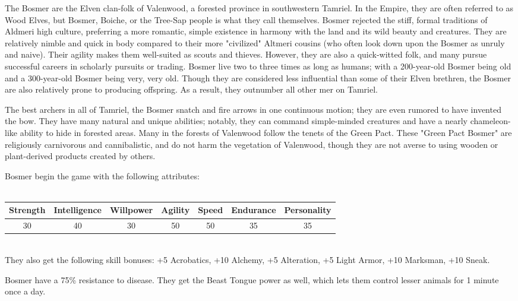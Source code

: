 \documentclass[12pt]{article}
\begin{document}
The Bosmer are the Elven clan-folk of Valenwood, a forested province in southwestern Tamriel. In the Empire, they are often referred to as Wood Elves, but Bosmer, Boiche, or the Tree-Sap people is what they call themselves. Bosmer rejected the stiff, formal traditions of Aldmeri high culture, preferring a more romantic, simple existence in harmony with the land and its wild beauty and creatures. They are relatively nimble and quick in body compared to their more "civilized" Altmeri cousins (who often look down upon the Bosmer as unruly and naive). Their agility makes them well-suited as scouts and thieves. However, they are also a quick-witted folk, and many pursue successful careers in scholarly pursuits or trading. Bosmer live two to three times as long as humans; with a 200-year-old Bosmer being old and a 300-year-old Bosmer being very, very old. Though they are considered less influential than some of their Elven brethren, the Bosmer are also relatively prone to producing offspring. As a result, they outnumber all other mer on Tamriel.

The best archers in all of Tamriel, the Bosmer snatch and fire arrows in one continuous motion; they are even rumored to have invented the bow. They have many natural and unique abilities; notably, they can command simple-minded creatures and have a nearly chameleon-like ability to hide in forested areas. Many in the forests of Valenwood follow the tenets of the Green Pact. These "Green Pact Bosmer" are religiously carnivorous and cannibalistic, and do not harm the vegetation of Valenwood, though they are not averse to using wooden or plant-derived products created by others.

Bosmer begin the game with the following attributes:\\~\\
\begin{tabular}{|c|c|c|c|c|c|c|}
\hline
Strength & Intelligence & Willpower & Agility & Speed & Endurance & Personality\\ \hline
30 & 40 & 30 & 50 & 50 & 35 & 35\\ \hline

\end{tabular}\\

They also get the following skill bonuses: +5 Acrobatics, +10 Alchemy, +5 Alteration, +5 Light Armor, +10 Marksman, +10 Sneak.

Bosmer have a 75\% resistance to disease. They get the Beast Tongue power as well, which lets them control lesser animals for 1 minute once a day.\\
\end{document}
